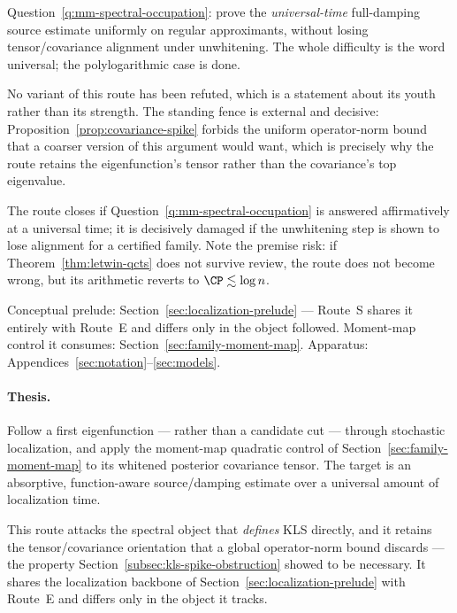 \documentclass[../../main.tex]{subfiles}
\begin{document}
\begin{description}[leftmargin=0pt,style=nextline,itemsep=0.3em]
  \item[5. Exact bottleneck.] Question~\ref{q:mm-spectral-occupation}: prove the
  \emph{universal-time} full-damping source estimate uniformly on regular approximants, without
  losing tensor/covariance alignment under unwhitening. The whole difficulty is the word
  universal; the polylogarithmic case is done.

  \item[6. Failed variants and obstructions.] No variant of this route has been refuted, which
  is a statement about its youth rather than its strength. The standing fence is external and
  decisive: Proposition~\ref{prop:covariance-spike} forbids the uniform operator-norm bound
  that a coarser version of this argument would want, which is precisely why the route retains
  the eigenfunction's tensor rather than the covariance's top eigenvalue.

  \item[7. Completion or reopening criterion.] The route closes if
  Question~\ref{q:mm-spectral-occupation} is answered affirmatively at a universal time; it is
  decisively damaged if the unwhitening step is shown to lose alignment for a certified family.
  Note the premise risk: if Theorem~\ref{thm:letwin-qcts} does not survive review, the route
  does not become wrong, but its arithmetic reverts to $\CP\lesssim\log n$.

  \item[8. Technical reading guide.] Conceptual prelude:
  Section~\ref{sec:localization-prelude} --- Route~S shares it entirely with Route~E and
  differs only in the object followed. Moment-map control it consumes:
  Section~\ref{sec:family-moment-map}. Apparatus:
  Appendices~\ref{sec:notation}--\ref{sec:models}.
\end{description}

\paragraph{Thesis.}
Follow a first eigenfunction --- rather than a candidate cut --- through stochastic localization,
and apply the moment-map quadratic control of Section~\ref{sec:family-moment-map} to its whitened
posterior covariance tensor. The target is an absorptive, function-aware source/damping estimate
over a universal amount of localization time.

This route attacks the spectral object that \emph{defines} KLS directly, and it retains the
tensor/covariance orientation that a global operator-norm bound discards --- the property
Section~\ref{subsec:kls-spike-obstruction} showed to be necessary. It shares the localization
backbone of Section~\ref{sec:localization-prelude} with Route~E and differs only in the object it
tracks.
\end{document}
